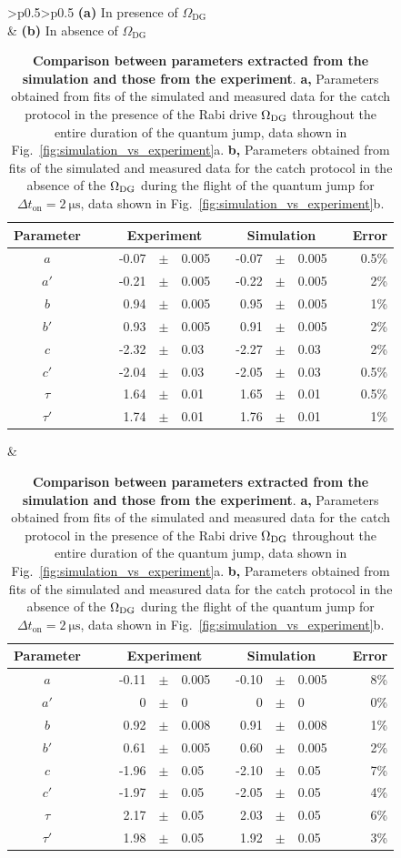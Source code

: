 \documentclass[
						superscriptaddress, 																 amsmath, amssymb,
		 aps,  prb,  
										floatfix,
		linenumbers,
			]{revtex4-1}
\begin{document}
\begin{table}
\begin{centering}
\begin{tabular}{>{\centering}p{}>{\centering}p{}}
     \textbf{(a)} In presence of $\Omega_{\mathrm{DG}}$  \\
 & \textbf{(b)} In absence of $\Omega_{\mathrm{DG}}$  \\
\tabularnewline
\centering{}\renewcommand*\arraystretch{1.2}
\begin{tabular}{cc|crcllrrlcr}
Parameter & \multicolumn{1}{c}{} &  & \multicolumn{3}{c}{Experiment} &  & \multicolumn{3}{c}{Simulation} &  & Error\tabularnewline
\hline 
\rule{0pt}{3ex} $a$ &  &  & -0.07 & $\pm$ & 0.005 &  & -0.07 & $\pm$ & 0.005 &  & 0.5\%\tabularnewline
$a'$ &  &  & -0.21 & $\pm$ & 0.005 &  & -0.22 & $\pm$ & 0.005 &  & 2\%\tabularnewline
$b$ &  &  & 0.94 & $\pm$ & 0.005 &  & 0.95 & $\pm$ & 0.005 &  & 1\%\tabularnewline
$b'$ &  &  & 0.93 & $\pm$ & 0.005 &  & 0.91 & $\pm$ & 0.005 &  & 2\%\tabularnewline
$c$ &  &  & -2.32 & $\pm$ & 0.03 &  & -2.27 & $\pm$ & 0.03 &  & 2\%\tabularnewline
$c'$ &  &  & -2.04 & $\pm$ & 0.03 &  & -2.05 & $\pm$ & 0.03 &  & 0.5\%\tabularnewline
$\tau$ &  &  & 1.64 & $\pm$ & 0.01 &  & 1.65 & $\pm$ & 0.01 &  & 0.5\%\tabularnewline
$\tau'$ &  &  & 1.74 & $\pm$ & 0.01 &  & 1.76 & $\pm$ & 0.01 &  & 1\%\tabularnewline
\end{tabular} & \centering{}\renewcommand*\arraystretch{1.2}
\begin{tabular}{cc|crcllrrlcr}
Parameter & \multicolumn{1}{c}{} &  & \multicolumn{3}{c}{Experiment} &  & \multicolumn{3}{c}{Simulation} &  & Error\tabularnewline
\hline 
\rule{0pt}{3ex} $a$ &  &  & -0.11 & $\pm$ & 0.005 &  & -0.10 & $\pm$ & 0.005 &  & 8\%\tabularnewline
$a'$ &  &  & 0 & $\pm$ & 0 &  & 0 & $\pm$ & 0 &  & 0\%\tabularnewline
$b$ &  &  & 0.92 & $\pm$ & 0.008 &  & 0.91 & $\pm$ & 0.008 &  & 1\%\tabularnewline
$b'$ &  &  & 0.61 & $\pm$ & 0.005 &  & 0.60 & $\pm$ & 0.005 &  & 2\%\tabularnewline
$c$ &  &  & -1.96 & $\pm$ & 0.05 &  & -2.10 & $\pm$ & 0.05 &  & 7\%\tabularnewline
$c'$ &  &  & -1.97 & $\pm$ & 0.05 &  & -2.05 & $\pm$ & 0.05 &  & 4\%\tabularnewline
$\tau$ &  &  & 2.17 & $\pm$ & 0.05 &  & 2.03 & $\pm$ & 0.05 &  & 6\%\tabularnewline
$\tau'$ &  &  & 1.98 & $\pm$ & 0.05 &  & 1.92 & $\pm$ & 0.05 &  & 3\%\tabularnewline
\end{tabular}\tabularnewline
\end{tabular}
\par\end{centering}
\caption{\label{tab:Comparison-of-parameters} \textbf{Comparison between 
parameters extracted from the simulation and those from the experiment}. 
\textbf{a,}
Parameters obtained from fits of the simulated and measured data for the catch protocol
in the presence of the Rabi drive $\Omega_{{\rm DG}}$ throughout the
entire duration of the quantum jump, data shown in Fig.~\ref{fig:simulation_vs_experiment}a. 
\textbf{b,} Parameters obtained
from fits of the simulated and measured data
for the catch protocol in the absence of the $\Omega_{{\rm DG}}$
during the flight of the quantum jump for $\Delta t_{\mathrm{on}}=2\mathrm{\ \mu s}$, data shown in  Fig.~\ref{fig:simulation_vs_experiment}b.
}
\end{table}
\end{document}
